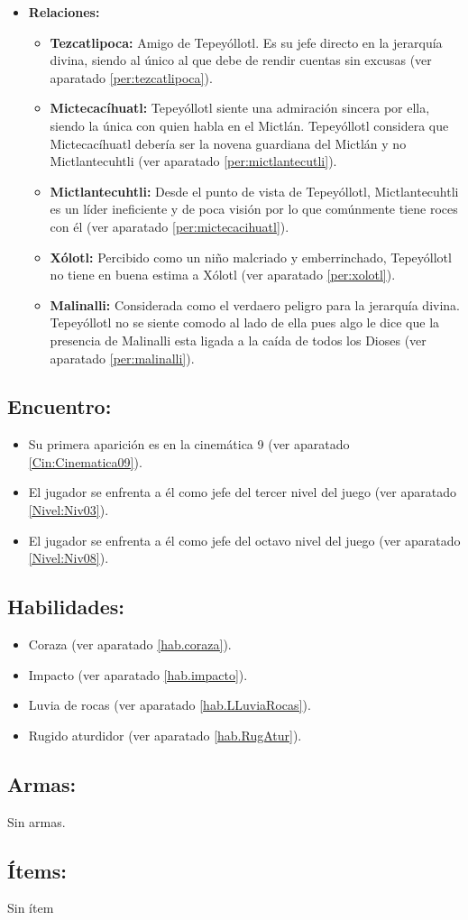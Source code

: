 \begin{itemize}
	\item \textbf{Relaciones:}
	\begin{itemize}
		\item \textbf{Tezcatlipoca:} Amigo de Tepeyóllotl. Es su jefe directo en la jerarquía divina, siendo al único al que debe de rendir cuentas sin excusas (ver aparatado \ref{per:tezcatlipoca}). 
		\item \textbf{Mictecacíhuatl:} Tepeyóllotl siente una admiración sincera por ella, siendo la única con quien habla en el Mictlán. Tepeyóllotl considera que  Mictecacíhuatl debería ser la novena guardiana del  Mictlán y no Mictlantecuhtli (ver aparatado \ref{per:mictlantecutli}).
		
		\item \textbf{Mictlantecuhtli:} Desde el punto de vista de Tepeyóllotl,  Mictlantecuhtli es un líder ineficiente y de poca visión por lo que comúnmente tiene roces con él (ver aparatado \ref{per:mictecacihuatl}).
		
		\item \textbf{Xólotl:} Percibido como un niño malcriado y emberrinchado, Tepeyóllotl no tiene en buena estima a Xólotl (ver aparatado \ref{per:xolotl}).
		
		\item \textbf{Malinalli:} Considerada como el verdaero peligro para la jerarquía divina. Tepeyóllotl no se siente comodo al lado de ella pues algo le dice que la presencia de Malinalli esta ligada a la caída de todos los Dioses (ver aparatado \ref{per:malinalli}).
	\end{itemize}                     
\end{itemize}
\subsection{Encuentro:}
\begin{itemize}
	\item Su primera aparición es en la cinemática 9 (ver aparatado \ref{Cin:Cinematica09}). 
	\item El jugador se enfrenta a él como jefe del tercer nivel del juego (ver aparatado \ref{Nivel:Niv03}).
	\item El jugador se enfrenta a él como jefe del octavo nivel del juego (ver aparatado \ref{Nivel:Niv08}).
\end{itemize}

\subsection{Habilidades:}
\begin{itemize}
        \item Coraza (ver aparatado \ref{hab.coraza}).   
        \item Impacto (ver aparatado \ref{hab.impacto}).
        \item Luvia de rocas (ver aparatado \ref{hab.LLuviaRocas}). 
	  \item Rugido aturdidor (ver aparatado \ref{hab.RugAtur}). 
\end{itemize}
\subsection{Armas:}
Sin armas.
\subsection{Ítems:}
Sin ítem